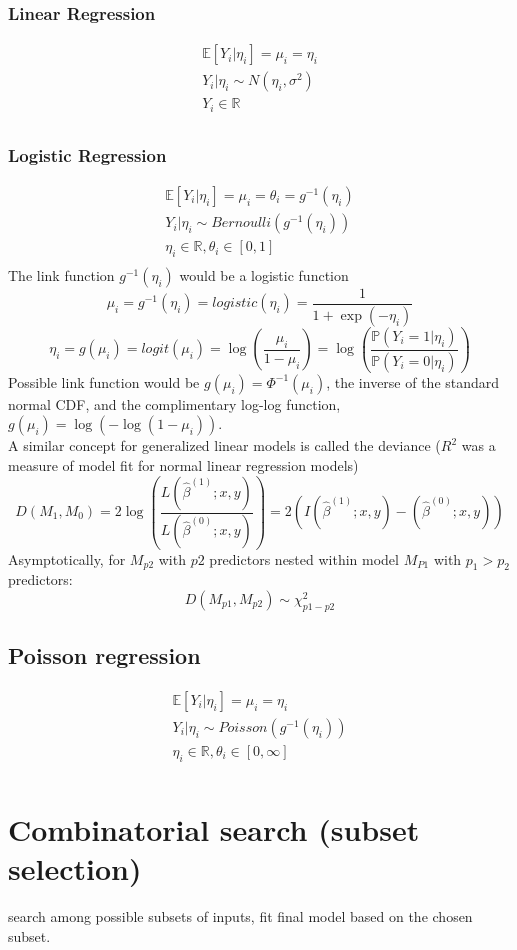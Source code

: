 \documentclass[12pt,a4paper]{article}
\begin{document}
\subsubsection*{Linear Regression}
\begin{eqnarray*}
\mathbb{E}[Y_i|\eta_i] = \mu_i=\eta_i \\
Y_i|\eta_i \sim N(\eta_i,\sigma^2) \\
Y_i \in \mathbb{R} \\
\end{eqnarray*}
\subsubsection*{Logistic Regression}
\begin{eqnarray*}
\mathbb{E}[Y_i|\eta_i] = \mu_i=\theta_i = g^{-1}(\eta_i) \\
Y_i|\eta_i \sim Bernoulli(g^{-1}(\eta_i))\\
\eta_i \in \mathbb{R}, \theta_i\in[0,1] \\
\end{eqnarray*}
The link function $g^{-1}(\eta_i)$ would be a logistic function
$$
\mu_i = g^{-1}(\eta_i)=logistic(\eta_i) = \frac{1}{1+\exp(-\eta_i)}
$$
$$
\eta_i = g(\mu_i) = logit(\mu_i) = \log (\frac{\mu_i}{1-\mu_i}) = \log(\frac{\mathbb{P}(Y_i=1|\eta_i)}{\mathbb{P}(Y_i=0|\eta_i)})
$$
Possible link function would be $g(\mu_i) = \Phi^{-1}(\mu_i)$, the inverse of the standard normal CDF, and the complimentary log-log function, $g(\mu_i) = \log(-\log(1-\mu_i))$. \\
A similar concept for generalized linear models is called the deviance ($R^2$ was a measure of model fit for normal linear regression models) \\
$$
D(M_1,M_0) = 2 \log(\frac{L(\hat \beta^{(1)};x,y)}{L(\hat \beta^{(0)};x,y)}) = 2(I(\hat \beta^{(1)};x,y)- (\hat \beta^{(0)};x,y))
$$
Asymptotically, for $M_{p2}$ with $p2$ predictors nested within model $M_{P1}$ with $p_1 > p_2$ predictors:
$$
D(M_{p1},M_{p2}) \sim \chi^2_{p1-p2}
$$
\subsection*{Poisson regression}
\begin{eqnarray*}
\mathbb{E}[Y_i|\eta_i] = \mu_i=\eta_i \\
Y_i|\eta_i \sim Poisson(g^{-1}(\eta_i))\\
\eta_i \in \mathbb{R}, \theta_i\in[0,\infty] \\
\end{eqnarray*}
\section*{Combinatorial search (subset selection)}
search among possible subsets of inputs, fit final model based on the chosen subset.
\end{document}
